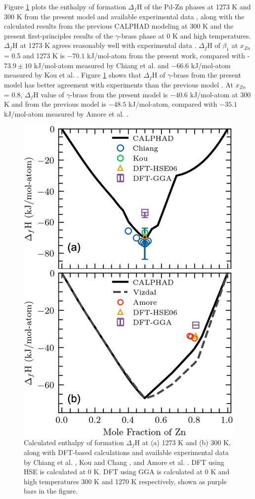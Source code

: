 Figure \ref{intermetallics:fig:PdZnHMR} plots the enthalpy of formation $\Delta_f$H of the Pd-Zn phases at 1273 K and 300 K from the present model and available experimental data \cite{amore2009thermochemistry, ChiangIpserChang1977, kou1975thermodynamics}, along with the calculated results from the previous CALPHAD modeling \cite{vizdal2006experimental} at 300 K and the present first-principles results of the $\gamma$-brass phase at 0 K and high temperatures. $\Delta_f$H at 1273 K agrees reasonably well with experimental data \cite{ChiangIpserChang1977, kou1975thermodynamics}. $\Delta_f$H of $\beta_1$ at $x_{Zn}$ = 0.5 and 1273 K is $-70.1$ kJ/mol-atom from the present work, compared with -$73.9\pm10$ kJ/mol-atom measured by Chiang et al. \cite{ChiangIpserChang1977} and $-66.6$ kJ/mol-atom measured by Kou et al. \cite{kou1975thermodynamics}. Figure \ref{intermetallics:fig:PdZnHMR} shows that $\Delta_f$H of $\gamma$-brass from the present model has better agreement with experiments than the previous model \cite{vizdal2006experimental}. At $x_{Zn}$ = 0.8, $\Delta_f$H value of $\gamma$-brass from the present model is $-40.6$ kJ/mol-atom at 300 K and from the previous model \cite{vizdal2006experimental} is $-48.5$ kJ/mol-atom, compared with $-35.1$ kJ/mol-atom measured by Amore et al. \cite{amore2009thermochemistry}.

\begin{figure}[H]
    \centering
    \includegraphics[width=0.5\linewidth]{intermetallics/Intermetallics-PdZnHMR.jpg}
    \caption{Calculated enthalpy of formation $\Delta_f$H at (a) 1273 K and (b) 300 K, along with DFT-based calculations and available experimental data by Chiang et al. \cite{ChiangIpserChang1977}, Kou and Chang \cite{kou1975thermodynamics}, and Amore et al. \cite{amore2009thermochemistry}. DFT using HSE is calculated at 0 K. DFT using GGA is calculated at 0 K and high temperatures 300 K and 1270 K respectively, shown as purple bars in the figure.}
    \label{intermetallics:fig:PdZnHMR}
\end{figure}

